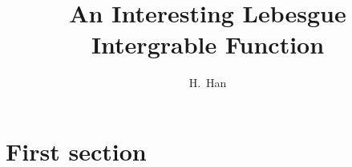 \documentclass{beamer}
\title[An Interesting Lebesgue Intergrable Function] %
{An Interesting Lebesgue Intergrable Function}
\author[H.~Han]
{H.~Han}
\begin{document}
\frame{\titlepage}




\section{First section}

%



%
%

\end{document}
